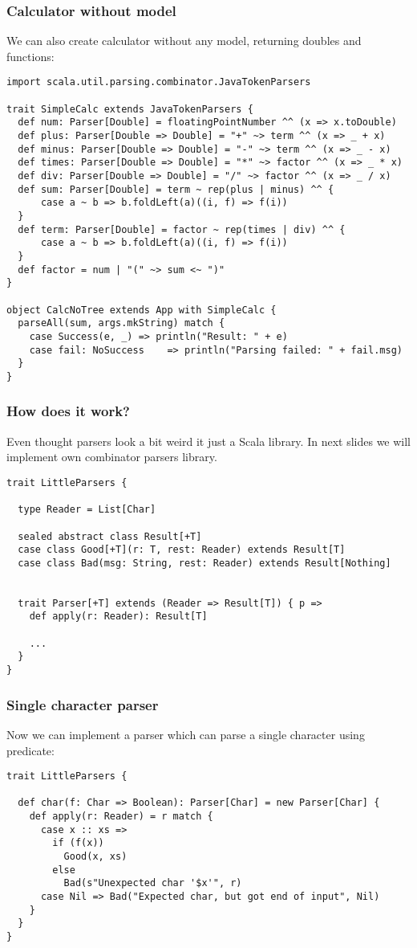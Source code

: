 \documentclass[t]{beamer}
\begin{document}
\begin{frame}[fragile]
\frametitle{Calculator without model}

We can also create calculator without any model, returning doubles and functions:

\begin{lstlisting}
import scala.util.parsing.combinator.JavaTokenParsers

trait SimpleCalc extends JavaTokenParsers {
  def num: Parser[Double] = floatingPointNumber ^^ (x => x.toDouble)
  def plus: Parser[Double => Double] = "+" ~> term ^^ (x => _ + x)
  def minus: Parser[Double => Double] = "-" ~> term ^^ (x => _ - x)
  def times: Parser[Double => Double] = "*" ~> factor ^^ (x => _ * x)
  def div: Parser[Double => Double] = "/" ~> factor ^^ (x => _ / x)
  def sum: Parser[Double] = term ~ rep(plus | minus) ^^ {
      case a ~ b => b.foldLeft(a)((i, f) => f(i))
  }
  def term: Parser[Double] = factor ~ rep(times | div) ^^ {
      case a ~ b => b.foldLeft(a)((i, f) => f(i))
  }
  def factor = num | "(" ~> sum <~ ")"
}

object CalcNoTree extends App with SimpleCalc {
  parseAll(sum, args.mkString) match {
    case Success(e, _) => println("Result: " + e)
    case fail: NoSuccess    => println("Parsing failed: " + fail.msg)
  }
}
\end{lstlisting}
\end{frame}

\begin{frame}[fragile]
\frametitle{How does it work?}
Even thought parsers look a bit weird it just a Scala library.  In next slides we will
implement own combinator parsers library.
\begin{lstlisting}
trait LittleParsers {

  type Reader = List[Char]

  sealed abstract class Result[+T]
  case class Good[+T](r: T, rest: Reader) extends Result[T]
  case class Bad(msg: String, rest: Reader) extends Result[Nothing]


  trait Parser[+T] extends (Reader => Result[T]) { p =>
    def apply(r: Reader): Result[T]

    ...
  }
}
\end{lstlisting}
\end{frame}

\begin{frame}[fragile]
\frametitle{Single character parser}
Now we can implement a parser which can parse a single character using predicate:
\begin{lstlisting}
trait LittleParsers {

  def char(f: Char => Boolean): Parser[Char] = new Parser[Char] {
    def apply(r: Reader) = r match {
      case x :: xs =>
        if (f(x))
          Good(x, xs)
        else
          Bad(s"Unexpected char '$x'", r)
      case Nil => Bad("Expected char, but got end of input", Nil)
    }
  }
}
\end{lstlisting}
\end{frame}
\end{document}
